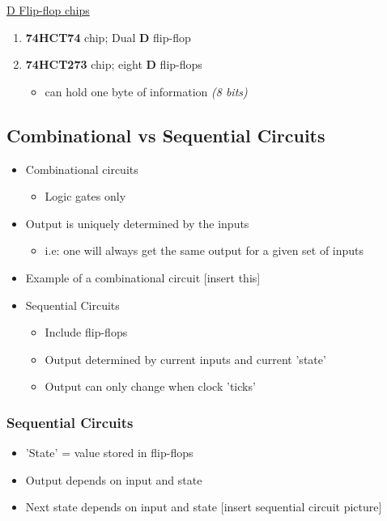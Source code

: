 \documentclass{article}
\begin{document}
\underline{D Flip-flop chips}
\begin{enumerate}
\item \textbf{74HCT74} chip; Dual \textbf{D} flip-flop
\item \textbf{74HCT273} chip; eight \textbf{D} flip-flops
\begin{itemize}
\item can hold one byte of information \textit{(8 bits)}
\end{itemize}
\end{enumerate}

\subsection{Combinational vs Sequential Circuits}
\begin{itemize}
\item Combinational circuits
\begin{itemize}
\item Logic gates only
\end{itemize}
\item Output is uniquely determined by the inputs
\begin{itemize}
\item i.e: one will always get the same output for a given set of inputs
\end{itemize}
\item Example of a combinational circuit [insert this]
\item Sequential Circuits
\begin{itemize}
\item Include flip-flops
\item Output determined by current inputs and current 'state'
\item Output can only change when clock 'ticks'
\end{itemize}
\end{itemize}

\subsubsection{Sequential Circuits}
\begin{itemize}
\item 'State' = value stored in flip-flops
\item Output depends on input and state
\item Next state depends on input and state
[insert sequential circuit picture]
\end{itemize}
\end{document}

